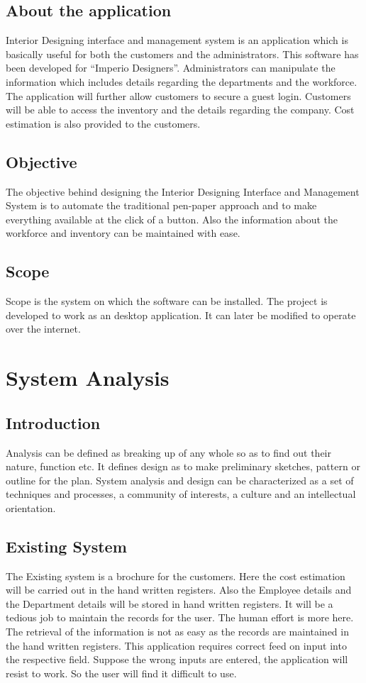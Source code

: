 \documentclass[12pt,a4paper]{report}
\begin{document}
\section{About the application}
Interior Designing interface and management system is an application which is basically useful for both the customers and the administrators. This software has been developed for “Imperio Designers”. Administrators can manipulate the information which includes details regarding the departments and the workforce. The application will further allow customers to secure a guest login. Customers will be able to access the inventory and the details regarding the company. Cost estimation is also provided to the customers. 

\section{Objective}
The objective behind designing the Interior Designing Interface and Management System is to automate the traditional pen-paper approach and to make everything available at the click of a button. Also the information about the workforce and inventory can be maintained with ease.

\section{Scope}
Scope is the system on which the software can be installed. The project is developed to work as an desktop application. It can later be modified to operate over the internet.

\chapter{System Analysis}%

\section{Introduction}
Analysis can be defined as breaking up of any whole so as to find out their nature, function etc. It defines design as to make preliminary sketches, pattern or outline for the plan. System analysis and design can be characterized as a set of techniques and processes, a community of interests, a culture and an intellectual orientation.

\section{Existing System}
The Existing system is a brochure for the customers. Here the cost estimation will be carried out in the hand written registers. Also the Employee details and the Department details will be stored in hand written registers. It will be a tedious job to maintain the records for the user. The human effort is more here. The retrieval of the information is not as easy as the records are maintained in the hand written registers. This application requires correct feed on input into the respective field. Suppose the wrong inputs are entered, the application will resist to work. So the user will find it difficult to use.
\end{document}
